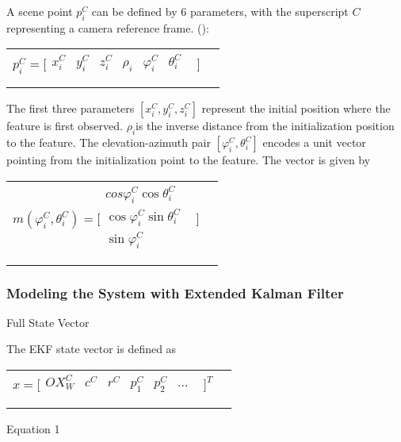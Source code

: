 A scene point $p_{i}^{C}$ can be defined by 6 parameters, with the 
superscript $C$ representing a camera reference frame. ():

\begin{table}[h]
\centering
\begin{tabular}{|l|l|}
\hline
$p_{i}^{C}=\lbrack \begin{matrix}
x_{i}^{C} & y_{i}^{C} & z_{i}^{C} & \rho _{i} & \varphi _{i}^{C} & 
\theta _{i}^{C} & \\
\end{matrix}
\rbrack $\\
 & \\
\hline
\end{tabular}
\end{table}
The first three parameters $[x_{i}^{C}, y_{i}^{C}, z_{i}^{C}]$ 
represent the initial position where the feature is first observed. $
\rho _{i}$is the inverse distance from the initialization position to 
the feature. The elevation-azimuth pair $[\varphi _{i}^{C}, \theta 
_{i}^{C}]$ encodes a unit vector pointing from the initialization point 
to the feature. The vector is given by

\begin{table}[h]
\centering
\begin{tabular}{|l|l|}
\hline
$m(\varphi _{i}^{C}, \theta _{i}^{C})=\lbrack \begin{matrix}
cos\varphi _{i}^{C}\cos \theta _{i}^{C} & \\
\cos \varphi _{i}^{C}\sin \theta _{i}^{C} & \\
\sin \varphi _{i}^{C} & \\
\end{matrix}
\rbrack $\\
 & \\
\hline
\end{tabular}
\end{table}


\subsubsection{Modeling the System with Extended Kalman 
Filter}\label{section:_Toc332876131}
Full State Vector

The EKF state vector is defined as 

\begin{table}[h]
\centering
\begin{tabular}{|l|l|}
\hline
$x=\lbrack \begin{matrix}
OX_{W}^{C} & c^{C} & r^{C} & p_{1}^{C} & p_{2}^{C} & \ldots & \\
\end{matrix}
\rbrack ^{T}$\\
 & \\
\hline
\end{tabular}
\end{table}
Equation 1

